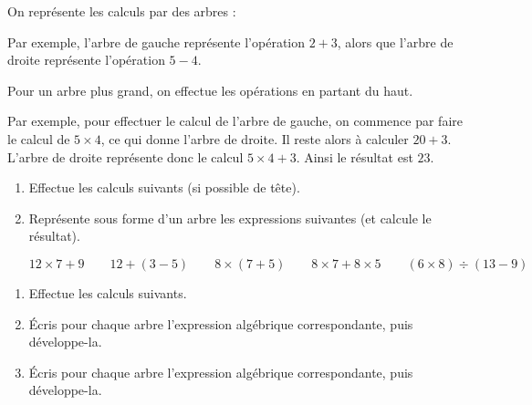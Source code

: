 \documentclass[class=report,crop=false, 12pt]{standalone}
\begin{document}

On représente les calculs par des arbres :


Par exemple, l'arbre de gauche représente l'opération $2 + 3$, alors que l'arbre de droite représente l'opération $5 - 4$.

Pour un arbre plus grand, on effectue les opérations en partant du haut.


Par exemple, pour effectuer le calcul de l'arbre de gauche, on commence par faire le calcul de $5 \times 4$, ce qui donne l'arbre de droite. Il reste alors à calculer $20 + 3$. L'arbre de droite représente donc le calcul $5 \times 4 + 3$. Ainsi le résultat est $23$.

\bigskip
\bigskip

\begin{activite}
\sauteligne 
\begin{enumerate}
  \item Effectue les calculs suivants (si possible de tête).


  
  \item Représente sous forme d'un arbre les expressions suivantes (et calcule le résultat).
  
  $$
  12 \times 7 + 9
  \qquad
  12 + (3 - 5)
  \qquad
  8 \times (7 + 5)
  \qquad
  8 \times 7 + 8 \times 5
  \qquad
  (6 \times 8) \div (13 - 9)
  $$
 
\end{enumerate}

\end{activite}


\begin{activite}
\sauteligne
\begin{enumerate}
  \item Effectue les calculs suivants.
  

  
  \item Écris pour chaque arbre l'expression algébrique correspondante, puis développe-la.


  
  \item Écris pour chaque arbre l'expression algébrique correspondante, puis développe-la.
  
 
\end{enumerate}
\end{activite}
\end{document}
